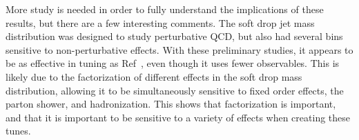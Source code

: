 More study is needed in order to fully understand the implications of these results, but there are a few interesting comments. 
The soft drop jet mass distribution was designed to study perturbative QCD, but also had several bins sensitive to non-perturbative effects. 
With these preliminary studies, it appears to be as effective in tuning as Ref~\cite{Aaboud:2019aii}, even though it uses fewer observables. 
This is likely due to the factorization of different effects in the soft drop mass distribution, allowing it to be simultaneously sensitive to fixed order effects, the parton shower, and hadronization. 
This shows that factorization is important, and that it is important to be sensitive to a variety of effects when creating these tunes.





